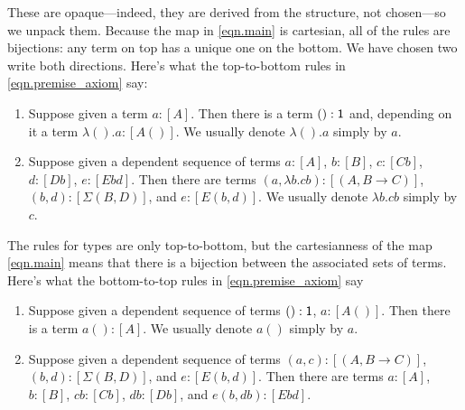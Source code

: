 \documentclass[11pt, one side, article]{memoir}
\theoremstyle{definition}
\theoremstyle{plain}
\newcommand{\0}{\textsf{0}}
\newcommand{\1}{\tn{\textsf{1}}}
\begin{document}
These are opaque---indeed, they are derived from the structure, not chosen---so we unpack them. Because the map in \eqref{eqn.main} is cartesian, all of the rules are bijections: any term on top has a unique one on the bottom. We have chosen two write both directions. Here's what the top-to-bottom rules in \eqref{eqn.premise_axiom} say:
\begin{enumerate}
	\item Suppose given a term $a:[A]$. Then there is a term $():\1$ and, depending on it a term $\lambda ().a:[A()]$. We usually denote $\lambda ().a$ simply by $a$.
	\item Suppose given a dependent sequence of terms $a:[A]$, $b:[B]$, $c:[C b]$, $d:[D b]$, $e: [E b d]$. Then there are terms $(a,\lambda b.cb):[(A,B\to C)]$, $(b, d):[\Sigma(B,D)]$, and $e:[E(b,d)]$. We usually denote $\lambda b.cb$ simply by $c$.
\end{enumerate}
The rules for types are only top-to-bottom, but the cartesianness of the map \eqref{eqn.main} means that there is a bijection between the associated sets of terms. Here's what the bottom-to-top rules in \eqref{eqn.premise_axiom} say
\begin{enumerate}[resume]
	\item Suppose given a dependent sequence of terms $():\1$, $a:[A()]$. Then there is a term $a():[A]$. We usually denote $a()$ simply by $a$.
	\item Suppose given a dependent sequence of terms $(a,c):[(A,B\to C)]$, $(b,d):[\Sigma(B,D)]$, and $e:[E(b,d)]$. Then there are terms $a:[A]$, $b:[B]$, $cb:[Cb]$, $db:[Db]$, and $e(b,db):[E b d]$.
\end{enumerate}
\end{document}
